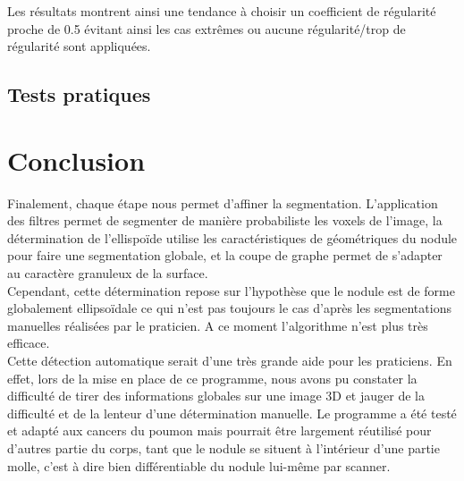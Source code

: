 \documentclass{article}
\begin{document}
Les résultats montrent ainsi une tendance à choisir un coefficient de régularité proche de 0.5 évitant ainsi les cas extrêmes ou aucune régularité/trop de régularité sont appliquées.

\subsection{Tests pratiques}

\section*{Conclusion}
Finalement, chaque étape nous permet d'affiner la segmentation. L'application des filtres permet de segmenter de manière probabiliste les voxels de l'image, la détermination de l'ellispoïde utilise les caractéristiques de géométriques du nodule pour faire une segmentation globale, et la coupe de graphe permet de s'adapter au caractère granuleux de la surface.\\
 Cependant, cette détermination repose sur l'hypothèse que le nodule est de forme globalement ellipsoïdale ce qui n'est pas toujours le cas d'après les segmentations manuelles réalisées par le praticien. A ce moment l'algorithme n'est plus très efficace.\\
Cette détection automatique serait d'une très grande aide pour les praticiens. En effet, lors de la mise en place de ce programme, nous avons pu constater la difficulté de tirer des informations globales sur une image 3D et jauger de la difficulté et de la lenteur d'une détermination manuelle. Le programme a été testé et adapté aux cancers du poumon mais pourrait être largement réutilisé pour d'autres partie du corps, tant que le nodule se situent à l'intérieur d'une partie molle, c'est à dire bien différentiable du nodule lui-même par scanner.

\end{document}
